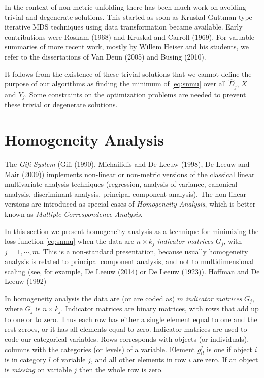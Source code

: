 \documentclass[
  12pt,
]{article}
\begin{document}
In the context of non-metric unfolding there has been much work
on avoiding trivial and degenerate solutions. This started as soon as
Kruskal-Guttman-type iterative MDS techniques using data transformation became available. Early contributions were Roskam (1968) and Kruskal and Carroll (1969). For valuable summaries of more recent work, mostly by Willem Heiser and his students, we refer to the dissertations of Van Deun (2005) and Busing (2010).

It follows from the existence of these trivial solutions that we cannot define the purpose of our algorithms as finding the minimum of \eqref{eq:snmu} over all \(\hat D_j\), \(X\) and \(Y_j\). Some constraints on the optimization problems are needed to prevent these trivial or degenerate solutions.

\section{Homogeneity Analysis}\label{hom}

The \emph{Gifi System} (Gifi (1990), Michailidis and De Leeuw (1998), De Leeuw and Mair (2009)) implements non-linear or non-metric versions of the classical linear multivariate analysis techniques (regression, analysis of variance, canonical analysis, discriminant analysis, principal component analysis). The non-linear versions are introduced as special cases of \emph{Homogeneity Analysis}, which is better known as \emph{Multiple Correspondence Analysis}.

In this section we present homogeneity analysis as a technique for
minimizing the loss function \eqref{eq:snmu} when the data are \(n\times k_j\) \emph{indicator matrices} \(G_j\), with \(j=1,\cdots,m\). This is a non-standard presentation, because usually homogeneity analysis is related to principal component analysis, and not to multidimensional scaling
(see, for example, De Leeuw (2014) or De Leeuw (1923)). Hoffman and De Leeuw (1992)

In homogeneity analysis the data are (or are coded as) \(m\) \emph{indicator matrices} \(G_j\), where \(G_j\) is \(n\times k_j\).
Indicator matrices are binary matrices, with rows that add up to one or to zero.
Thus each row has either a single element equal to one and the rest zeroes, or it has all elements equal to zero. Indicator matrices are
used to code our categorical variables. Rows corresponds with objects
(or individuals), columns with the categories (or levels) of a variable.
Element \(g_{il}^j\) is one if object \(i\) is in category \(l\) of variable \(j\), and all other elements in row \(i\) are zero. If an object is \emph{missing} on variable \(j\) then the whole row is zero.
\end{document}

